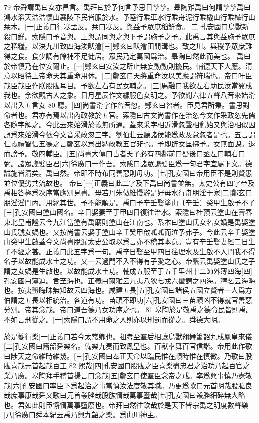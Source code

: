 79
帝舜謂禹曰女亦昌言。禹拜曰於予何言予思日孳孳。皋陶難禹曰何謂孳孳禹曰鴻水滔天浩浩懷山襄陵下民皆服於水。予陸行乘車水行乘舟泥行乘橇山行乘檋行山栞木。[一]正義曰行寒孟反。栞口寒反。與益予眾庶稻鮮食。[二]孔安國曰鳥獸新殺曰鮮。索隱曰予音與。上與謂同與之與下予謂施予之予。此禹言其與益施予眾庶之稻糧。以決九川致四海浚畎澮[三]鄭玄曰畎澮田閒溝也。致之川。與稷予眾庶難得之食。食少調有餘補不足徙居。眾民乃定萬國爲治。皋陶曰然此而美也。
禹曰於帝慎乃在位安爾止。[一]鄭玄曰安汝之所止無妄動動則擾民。輔德天下大應。清意以昭待上帝命天其重命用休。[二]鄭玄曰天將重命汝以美應謂符瑞也。帝曰吁臣哉臣哉臣作朕股肱耳目。予欲左右有民女輔之。[三]馬融曰我欲左右助民汝當翼成我也。余欲觀古人之象。日月星辰作文繡服色女明之。予欲聞六律五聲八音來始滑以出入五言女
80
聽。[四]尚書滑字作曶音忽。鄭玄曰曶者。臣見君所秉。書思對命者也。君亦有焉以出內政教於五官。索隱曰古文尚書作在治忽今文作采政忽先儒各隨字解之。今此云來始滑於義無所通。蓋來采字相近滑忽聲相亂始又與治相似因誤爲來始滑今依今文音采政忽三字。劉伯莊云聽諸侯能爲政及怠忽者是也。五言謂仁義禮智信五德之言鄭玄以爲出納政教五官非也。予即辟女匡拂予。女無面諛。退而謗予。敬四輔臣。[五]尚書大傳曰古者天子必有四鄰前曰疑後曰丞左曰輔右曰弼。諸眾讒嬖臣君[六]徐廣曰一作吾。索隱曰諸眾讒嬖臣爲一句君字宜屬下文。德誠施皆清矣。禹曰然。帝即不時布同善惡則毋功。[七]孔安國曰帝用臣不是則賢愚並位優劣共流故也。
帝曰[一]正義曰此二字及下禹曰尚書並無。太史公有四字帝及禹相答極爲次序當應別見書。毋若丹朱傲維慢游是好毋水行舟朋淫于家[二]鄭玄曰朋淫淫門內。用絕其世。予不能順是。禹曰予辛壬娶塗山〔辛壬〕癸甲生啟予不子[三]孔安國曰塗山國名。辛日娶妻至于甲四日復往治水。索隱曰杜預云塗山在壽春東北皇甫謐云今九江當塗有禹廟則塗山在江南也。系本曰塗山氏女名女媧是禹娶塗山氏號女媧也。又按尚書云娶于塗山辛壬癸甲啟呱呱而泣予弗子。今此云辛壬娶塗山癸甲生啟蓋今文尚書脫漏太史公取以爲言亦不稽其本意。豈有辛壬娶妻經二日生子不經之甚。正義曰此五字爲一句。禹辛日娶至甲四日往理水及生啟不入門我不得名子以故能成水土之功。又一云過門不入不得有子愛之心。帝繫云禹娶塗山氏之子謂之女媧是生啟也。以故能成水土功。輔成五服至于五千里州十二師外薄四海[四]孔安國曰薄迫。言至海也。正義曰爾雅云九夷八狄七戎六蠻謂之四海。釋名云海晦也。按夷蠻晦昧無知故云四海也。咸建五長[五]孔安國曰諸侯五國立賢者一人爲方伯謂之五長以相統治。各道有功。苗頑不即功[六]孔安國曰三苗頑凶不得就官善惡分別。帝其念哉。帝曰道吾德乃女功序之也。
81
皋陶於是敬禹之德令民皆則禹。不如言刑從之。[一]索隱曰謂不用命之人則亦以刑罰而從之。舜德大明。

於是夔行樂[一]正義曰若今太常卿也。祖考至羣后相讓鳥獸翔舞簫韶九成鳳皇來儀[二]孔安國曰簫韶舜樂名。備樂九奏而致鳳皇也。百獸率舞百官信諧。帝用此作歌曰陟天之命維時維幾。[三]孔安國曰奉正天命以臨民惟在順時惟在慎微。乃歌曰股肱喜哉元首起哉百工
82
熙哉[四]孔安國曰股肱之臣喜樂盡忠君之治功乃起百官之業乃廣。皋陶拜手稽首揚言曰念哉[五]鄭玄曰使羣臣念帝之戒。率爲興事慎乃憲敬哉[六]孔安國曰率臣下爲起治之事當慎汝法度敬其職。乃更爲歌曰元首明哉股肱良哉庶事康哉舜又歌曰元首叢脞哉股肱惰哉萬事墮哉[七]孔安國曰叢脞細碎無大略也。君如此則臣懈惰萬事墮廢也。帝拜曰然往欽哉於是天下皆宗禹之明度數聲樂[八]徐廣曰舜本紀云禹乃興九韶之樂。爲山川神主。

